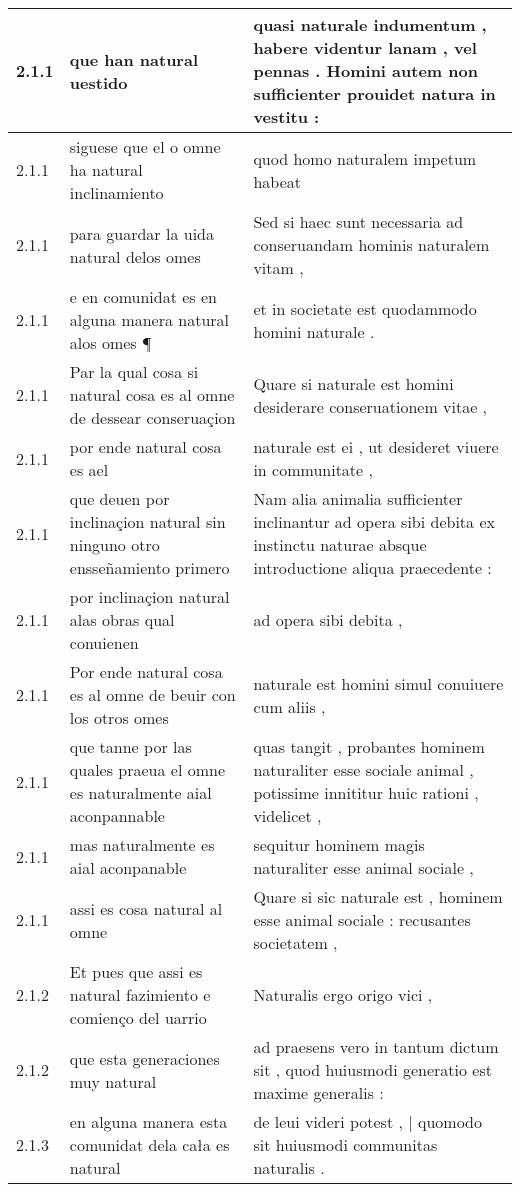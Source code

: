 \begin{tabular}{|p{1cm}|p{6.5cm}|p{6.5cm}|}
2.1.1 & que han natural uestido & quasi naturale indumentum , habere videntur lanam , vel pennas . Homini autem non sufficienter prouidet natura in vestitu : \\\hline
2.1.1 & siguese que el o omne ha natural inclinamiento & quod homo naturalem impetum habeat \\\hline
2.1.1 & para guardar la uida natural delos omes & Sed si haec sunt necessaria ad conseruandam hominis naturalem vitam , \\\hline
2.1.1 & e en comunidat es en alguna manera natural alos omes ¶ & et in societate est quodammodo homini naturale . \\\hline
2.1.1 & Par la qual cosa si natural cosa es al omne de dessear conseruaçion & Quare si naturale est homini desiderare conseruationem vitae , \\\hline
2.1.1 & por ende natural cosa es ael & naturale est ei , ut desideret viuere in communitate , \\\hline
2.1.1 & que deuen por inclinaçion natural sin ninguno otro ensseñamiento primero & Nam alia animalia sufficienter inclinantur ad opera sibi debita ex instinctu naturae absque introductione aliqua praecedente : \\\hline
2.1.1 & por inclinaçion natural alas obras qual conuienen & ad opera sibi debita , \\\hline
2.1.1 & Por ende natural cosa es al omne de beuir con los otros omes & naturale est homini simul conuiuere cum aliis , \\\hline
2.1.1 & que tanne por las quales praeua el omne es naturalmente aial aconpannable & quas tangit , probantes hominem naturaliter esse sociale animal , potissime innititur huic rationi , videlicet , \\\hline
2.1.1 & mas naturalmente es aial aconpanable & sequitur hominem magis naturaliter esse animal sociale , \\\hline
2.1.1 & assi es cosa natural al omne & Quare si sic naturale est , hominem esse animal sociale : recusantes societatem , \\\hline
2.1.2 & Et pues que assi es natural fazimiento e comienço del uarrio & Naturalis ergo origo vici , \\\hline
2.1.2 & que esta generaciones muy natural & ad praesens vero in tantum dictum sit , quod huiusmodi generatio est maxime generalis : \\\hline
2.1.3 & en alguna manera esta comunidat dela cała es natural & de leui videri potest , | quomodo sit huiusmodi communitas naturalis . \\\hline

\end{tabular}
